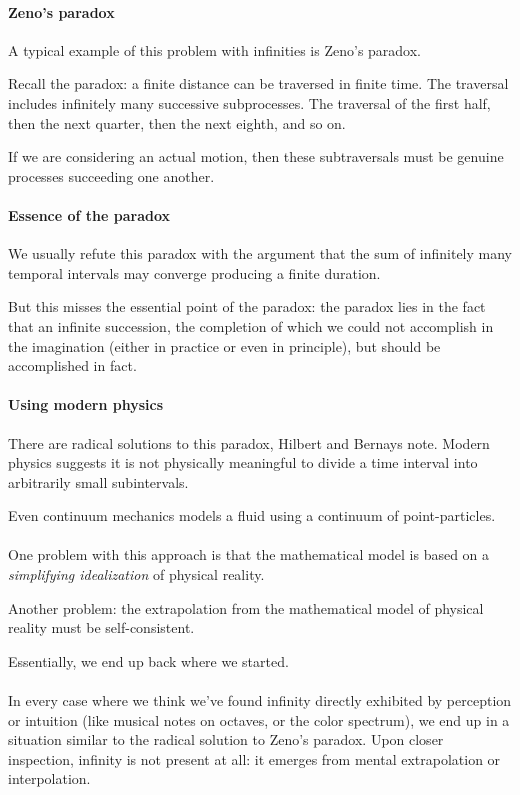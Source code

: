 \paragraph{Zeno's paradox}
A typical example of this problem with infinities is Zeno's paradox.

Recall the paradox: a finite distance can be traversed in finite
time. The traversal includes infinitely many successive
subprocesses. The traversal of the first half, then the next quarter,
then the next eighth, and so on.

If we are considering an actual motion, then these subtraversals must
be genuine processes succeeding one another.

\paragraph{Essence of the paradox}
We usually refute this paradox with the argument that the sum of
infinitely many temporal intervals may converge producing a finite
duration.

But this misses the essential point of the paradox: the paradox lies
in the fact that an infinite succession, the completion of which we
could not accomplish in the imagination (either in practice or even in
principle), but should be accomplished in fact.

\paragraph{Using modern physics}
There are radical solutions to this paradox, Hilbert and Bernays note.
Modern physics suggests it is not physically meaningful to divide a
time interval into arbitrarily small subintervals.

Even continuum mechanics models a fluid using a continuum of
point-particles. 

\paragraph{}
One problem with this approach is that the mathematical model is based
on a \emph{simplifying idealization} of physical reality.

Another problem: the extrapolation from the mathematical model of
physical reality must be self-consistent.

Essentially, we end up back where we started.

\paragraph{}
In every case where we think we've found infinity directly exhibited
by perception or intuition (like musical notes on octaves, or the
color spectrum), we end up in a situation similar to the radical
solution to Zeno's paradox. Upon closer inspection, infinity is not
present at all: it emerges from mental extrapolation or interpolation.


